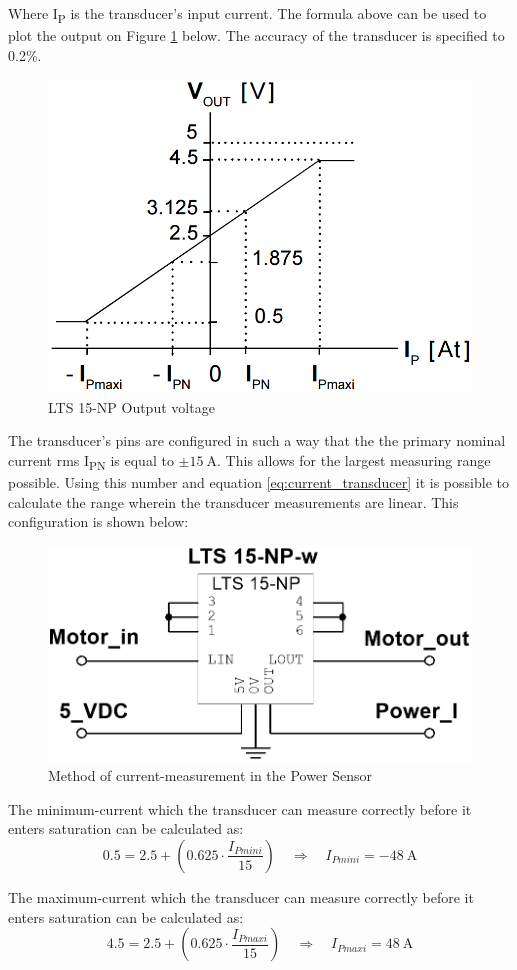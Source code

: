 Where I\textsubscript{P} is the transducer's input current. The formula above can be used to plot the output on Figure \ref{fig:LTS_output} below. The accuracy of the transducer is specified to 0.2\%.

\begin{figure}[H]
	\centering
	\includegraphics[width=0.4\linewidth]{Hardware/Pictures/LTS_output}
	\caption{LTS 15-NP Output voltage}
	\label{fig:LTS_output}
\end{figure}

The transducer's pins are configured in such a way that the the primary nominal current rms I\textsubscript{PN} is equal to $\pm \SI{15}{\ampere}$. This allows for the largest measuring range possible. Using this number and equation \ref{eq:current_transducer} it is possible to calculate the range wherein the transducer measurements are linear. This configuration is shown below:

\begin{figure}[H]
	\centering
	\includegraphics[width=0.6\linewidth]{Hardware/Pictures/PowerSensor_Current}
	\caption{Method of current-measurement in the Power Sensor}
	\label{fig:PowerSensorCurrent}
\end{figure}

The minimum-current which the transducer can measure correctly before it enters saturation can be calculated as:
\begin{equation}
	0.5 = 2.5 + \left( 0.625 \cdot \frac{I_{Pmini}}{15} \right) \quad \Rightarrow \quad I_{Pmini} = \SI{-48}{\ampere}
\end{equation}

The maximum-current which the transducer can measure correctly before it enters saturation can be calculated as:
\begin{equation}
	4.5 = 2.5 + \left( 0.625 \cdot \frac{I_{Pmaxi}}{15} \right) \quad \Rightarrow \quad I_{Pmaxi} = \SI{48}{\ampere}
\end{equation}

